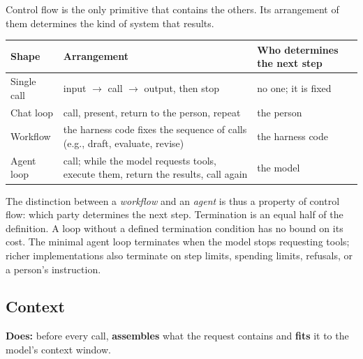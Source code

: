 Control flow is the only primitive that contains the others. Its arrangement of them determines the kind of system that results.

{\def\LTcaptype{none} 
\begin{longtable}[]{@{}
  >{\raggedright\arraybackslash}p{}
  >{\raggedright\arraybackslash}p{}
  >{\raggedright\arraybackslash}p{}@{}}
\toprule\noalign{}
\begin{minipage}[b]{\linewidth}\raggedright
Shape
\end{minipage} & \begin{minipage}[b]{\linewidth}\raggedright
Arrangement
\end{minipage} & \begin{minipage}[b]{\linewidth}\raggedright
Who determines the next step
\end{minipage} \\
\midrule\noalign{}
\endhead
\bottomrule\noalign{}
\endlastfoot
Single call & input \(\rightarrow\) call \(\rightarrow\) output, then stop & no one; it is fixed \\
Chat loop & call, present, return to the person, repeat & the person \\
Workflow & the harness code fixes the sequence of calls (e.g., draft, evaluate, revise) & the harness code \\
Agent loop & call; while the model requests tools, execute them, return the results, call again & the model \\
\end{longtable}
}

The distinction between a \emph{workflow} and an \emph{agent} \cite{schluntz2024building} is thus a property of control flow: which party determines the next step. Termination is an equal half of the definition. A loop without a defined termination condition has no bound on its cost. The minimal agent loop terminates when the model stops requesting tools; richer implementations also terminate on step limits, spending limits, refusals, or a person's instruction.

\subsection{Context}

\textbf{Does:} before every call, \textbf{assembles} what the request contains and \textbf{fits} it to the model's context window.

